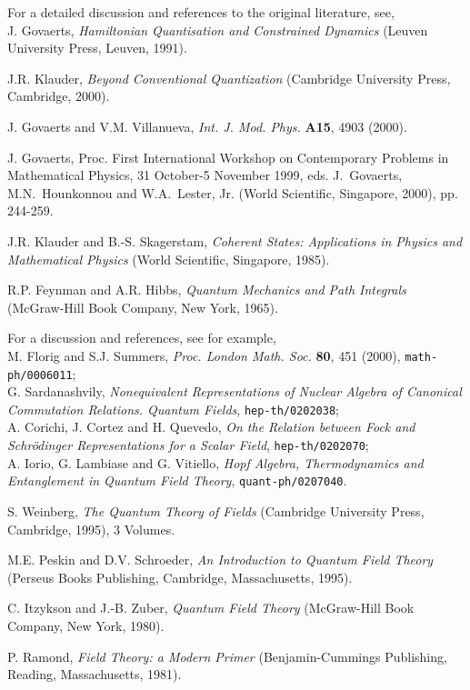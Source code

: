 \documentclass[a4paper,11pt]{article}
\begin{document}
\begin{thebibliography}{99}
 For a detailed discussion and references to the
original literature, see,\\
J. Govaerts, {\sl Hamiltonian Quantisation and Constrained Dynamics\/}
(Leuven University Press, Leuven, 1991).

 J.R. Klauder, {\sl Beyond Conventional Quantization\/}
(Cambridge University Press, Cambridge, 2000).

 J. Govaerts and V.M. Villanueva, {\em Int. J. Mod. Phys.\/} 
{\bf A15}, 4903 (2000).

 J. Govaerts, Proc. First International
Workshop on Contemporary Pro\-blems in Mathematical Physics, 
31 October-5 November
1999, eds. J.~Govaerts, M.N.~Hounkonnou and W.A.~Lester, Jr. (World Scientific,
Singapore, 2000), pp. 244-259.

J.R. Klauder and B.-S. Skagerstam, {\sl Coherent States: Applications in
Physics and Mathe\-ma\-ti\-cal Physics\/} (World Scientific, Singapore, 1985).

 R.P. Feynman and A.R. Hibbs, {\sl Quantum Mechanics and 
Path Integrals\/} (McGraw-Hill Book Company, New York, 1965).

 For a discussion and references, see for example,\\
M. Florig and S.J. Summers, {\em Proc. London Math. Soc.\/} {\bf 80}, 451 (2000),
{\tt math-ph/0006011};\\
G. Sardanashvily, {\sl Nonequivalent Representations of Nuclear Algebra of
Canonical Commutation Relations. Quantum Fields\/}, {\tt hep-th/0202038};\\
A. Corichi, J. Cortez and H. Quevedo, {\sl On the Relation between Fock and
Schr\"odinger Representations for a Scalar Field\/}, {\tt hep-th/0202070};\\
A. Iorio, G. Lambiase and G. Vitiello, {\sl Hopf Algebra, Thermodynamics
and Entanglement in Quantum Field Theory\/}, {\tt quant-ph/0207040}.

 S. Weinberg, {\sl The Quantum Theory of Fields\/}
(Cambridge University Press, Cambridge, 1995), 3 Volumes.

 M.E. Peskin and D.V. Schroeder, {\sl An Introduction to
Quantum Field Theory\/} (Perseus Books Publishing, Cambridge, Massachusetts,
1995).

 C. Itzykson and J.-B. Zuber, {\sl Quantum Field Theory\/}
(McGraw-Hill Book Company, New York, 1980).

 P. Ramond, {\sl Field Theory: a Modern Primer\/}
(Benjamin-Cummings Pu\-bli\-shing, Reading, Massachusetts, 1981).


\end{thebibliography}
\end{document}
